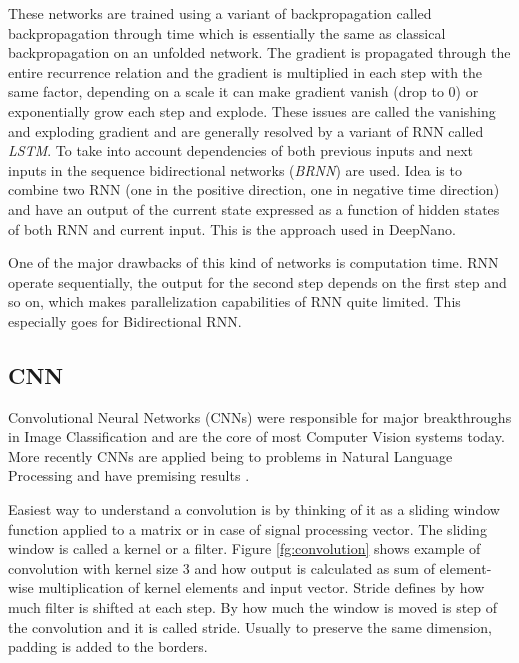 \documentclass[times, utf8, diplomski, numeric, english]{fer}
\begin{document}
These networks are trained using a variant of backpropagation called backpropagation through time which is essentially the same as classical backpropagation on an unfolded network. The gradient is propagated through the entire recurrence relation and the gradient is multiplied in each step with the same factor, depending on a scale it can make gradient vanish (drop to 0) or exponentially grow each step and explode. These issues are called the vanishing and exploding gradient\cite{rnn-blog} and are generally resolved by a variant of RNN called \textit{LSTM}\cite{hochreiter1997long}. To take into account dependencies of both previous inputs and next inputs in the sequence bidirectional networks (\textit{BRNN}) are used.  Idea is to combine two RNN (one in the positive direction, one in negative time direction) and have an output of the current state expressed as a function of hidden states of both RNN and current input. This is the approach used in DeepNano\cite{Boza2017}. 


One of the major drawbacks of this kind of networks is computation time. RNN operate sequentially, the output for the second step depends on the first step and so on, which makes parallelization capabilities of RNN quite limited. This especially goes for Bidirectional RNN.

\subsection{CNN}
Convolutional Neural Networks (CNNs) were responsible for major breakthroughs in Image Classification and are the core of most Computer Vision systems today. More recently CNNs are  applied being to problems in Natural Language Processing and have premising results \cite{bytenet}\cite{facebook}.

Easiest way to understand a convolution is by thinking of it as a sliding window function applied to a matrix or in case of signal processing vector. The sliding window is called a kernel or a filter.  Figure \ref{fg:convolution} shows example of convolution with kernel size 3 and how output is calculated as sum of element-wise multiplication of kernel elements and input vector. Stride defines by how much filter is shifted at each step. By how much the window is moved is step of the convolution and it is called stride. Usually to preserve the same dimension, padding is added to the borders. 
\end{document}

